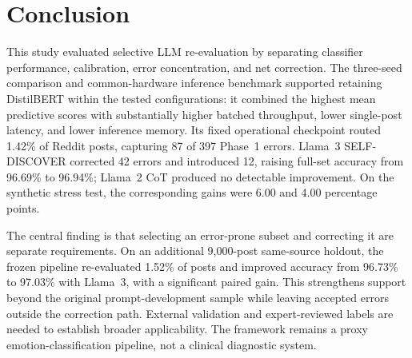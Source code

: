 \documentclass{ieeeaccess}
\begin{document}
\section{Conclusion}

This study evaluated selective LLM re-evaluation by separating classifier performance, calibration, error concentration, and net correction. The three-seed comparison and common-hardware inference benchmark supported retaining DistilBERT within the tested configurations: it combined the highest mean predictive scores with substantially higher batched throughput, lower single-post latency, and lower inference memory. Its fixed operational checkpoint routed 1.42\% of Reddit posts, capturing 87 of 397 Phase~1 errors. Llama~3 SELF-DISCOVER corrected 42 errors and introduced 12, raising full-set accuracy from 96.69\% to 96.94\%; Llama~2 CoT produced no detectable improvement. On the synthetic stress test, the corresponding gains were 6.00 and 4.00 percentage points.

The central finding is that selecting an error-prone subset and correcting it are separate requirements. On an additional 9,000-post same-source holdout, the frozen pipeline re-evaluated 1.52\% of posts and improved accuracy from 96.73\% to 97.03\% with Llama~3, with a significant paired gain. This strengthens support beyond the original prompt-development sample while leaving accepted errors outside the correction path. External validation and expert-reviewed labels are needed to establish broader applicability. The framework remains a proxy emotion-classification pipeline, not a clinical diagnostic system.
\end{document}
